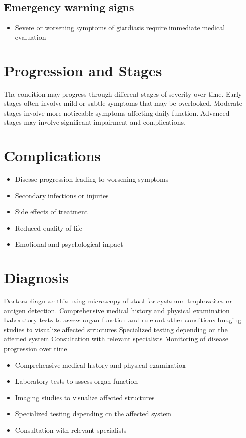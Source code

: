 \subsection{Emergency warning signs}
\begin{itemize}[noitemsep]
  \item Severe or worsening symptoms of giardiasis require immediate medical evaluation
\end{itemize}
\section{Progression and Stages}
The condition may progress through different stages of severity over time. Early stages often involve mild or subtle symptoms that may be overlooked. Moderate stages involve more noticeable symptoms affecting daily function. Advanced stages may involve significant impairment and complications.
\section{Complications}
\begin{itemize}[noitemsep]
  \item Disease progression leading to worsening symptoms
  \item Secondary infections or injuries
  \item Side effects of treatment
  \item Reduced quality of life
  \item Emotional and psychological impact
\end{itemize}
\section{Diagnosis}
Doctors diagnose this using microscopy of stool for cysts and trophozoites or antigen detection. Comprehensive medical history and physical examination Laboratory tests to assess organ function and rule out other conditions Imaging studies to visualize affected structures Specialized testing depending on the affected system Consultation with relevant specialists Monitoring of disease progression over time

\begin{itemize}[noitemsep]
  \item Comprehensive medical history and physical examination
  \item Laboratory tests to assess organ function
  \item Imaging studies to visualize affected structures
  \item Specialized testing depending on the affected system
  \item Consultation with relevant specialists
\end{itemize}

